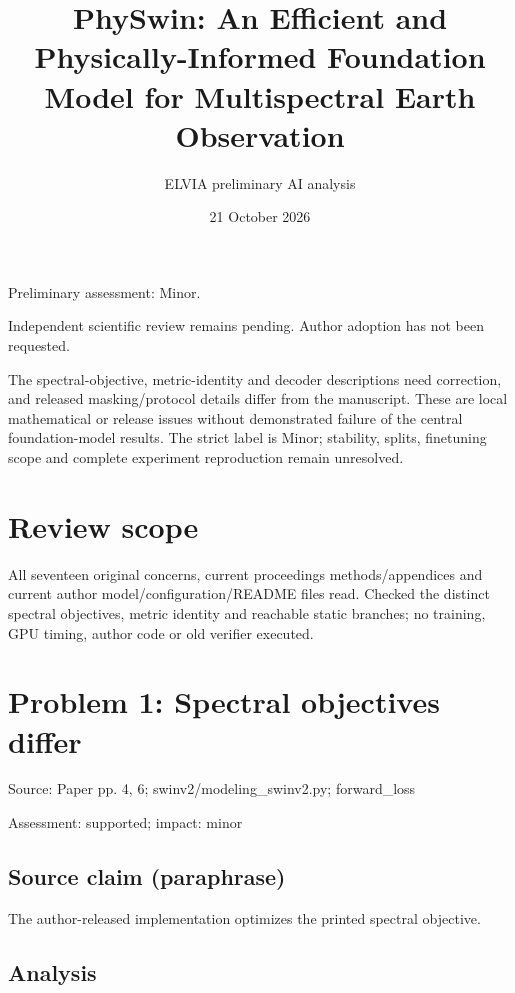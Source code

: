 \documentclass[11pt]{article}
\begin{document}
\title{PhySwin: An Efficient and Physically-Informed Foundation Model for Multispectral Earth Observation}

\author{ELVIA preliminary AI analysis}\date{21 October 2026}\maketitle

Preliminary assessment: Minor.\par

Independent scientific review remains pending. Author adoption has not been requested.

The spectral-objective, metric-identity and decoder descriptions need correction, and released masking/protocol details differ from the manuscript. These are local mathematical or release issues without demonstrated failure of the central foundation-model results. The strict label is Minor; stability, splits, finetuning scope and complete experiment reproduction remain unresolved.

\section*{Review scope}

All seventeen original concerns, current proceedings methods/appendices and current author model/configuration/README files read. Checked the distinct spectral objectives, metric identity and reachable static branches; no training, GPU timing, author code or old verifier executed.

\section*{Problem 1: Spectral objectives differ}

Source: Paper pp. 4, 6; swinv2/modeling\_swinv2.py; forward\_loss

Assessment: supported; impact: minor

\subsection*{Source claim (paraphrase)}

The author-released implementation optimizes the printed spectral objective.

\subsection*{Analysis}
\end{document}
